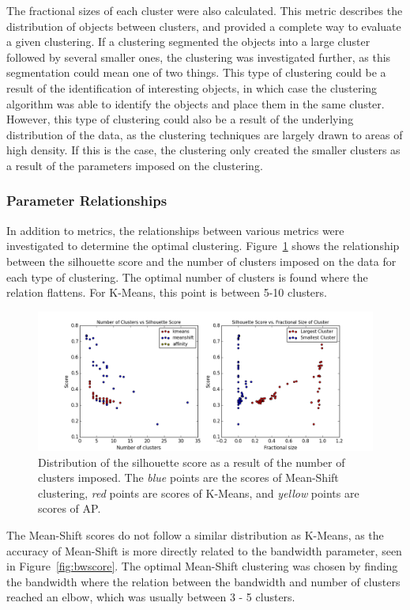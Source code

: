 The fractional sizes of each cluster were also calculated.
This metric describes the distribution of objects between clusters, and provided a complete way to evaluate a given clustering. 
If a clustering segmented the objects into a large cluster followed by several smaller ones, the clustering was investigated further, as this segmentation could mean one of two things. 
This type of clustering could be a result of the identification of interesting objects, in which case the clustering algorithm was able to identify the objects and place them in the same cluster.
However, this type of clustering could also be a result of the underlying distribution of the data, as the clustering techniques are largely drawn to areas of high density.
If this is the case, the clustering only created the smaller clusters as a result of the parameters imposed on the clustering.

\subsubsection{Parameter Relationships}
In addition to metrics, the relationships between various metrics were investigated to determine the optimal clustering.
Figure~\ref{fig:sscore} shows the relationship between the silhouette score and the number of clusters imposed on the data for each type of clustering. 
The optimal number of clusters is found where the relation flattens.
For K-Means, this point is between 5-10 clusters.

\begin{figure}[H]
\centering
\includegraphics[width=\linewidth]{figs/silhouette_score_relation}
\caption{Distribution of the silhouette score as a result of the number of clusters imposed. The \textit{blue} points are the scores of Mean-Shift clustering, \textit{red} points are scores of K-Means, and \textit{yellow} points are scores of AP.}
\label{fig:sscore}
\end{figure}

The Mean-Shift scores do not follow a similar distribution as K-Means, as the accuracy of Mean-Shift is more directly related to the bandwidth parameter, seen in Figure~\ref{fig:bwscore}.
The optimal Mean-Shift clustering was chosen by finding the bandwidth where the relation between the bandwidth and number of clusters reached an elbow, which was usually between 3 - 5 clusters.

